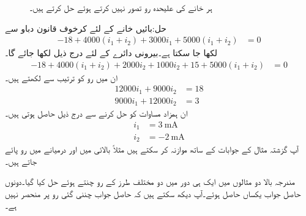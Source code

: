 \begin{figure}
\centering
{}%
\caption{ہر خانے کی علیحدہ رو تصور نہیں کرتے ہوئے حل کرتے ہیں۔}
\label{شکل_جوڑ_رو_دوسری_کو_لپیٹتی_ہے}
\end{figure}%
حل:بائیں خانے کے لئے کرخوف قانون دباو سے
\begin{align*}
-18+4000(i_1+i_2)+3000 i_1+5000(i_1+i_2)&=0
\end{align*}
لکھا جا سکتا ہے۔بیرونی دائرے کے لئے درج ذیل لکھا جائے گا۔
\begin{align*}
-18+4000(i_1+i_2)+2000i_2 +1000i_2 +15+5000(i_1+i_2)&=0
\end{align*}
ان میں رو کو ترتیب سے لکھتے ہیں۔
\begin{align*}
12000 i_1+9000 i_2&=18\\
9000i_1+12000i_2&=3
\end{align*}
ان ہمزاد مساوات کو حل کرنے سے درج ذیل حاصل ہوتی ہیں۔
\begin{align*}
i_1&=\SI{3}{\milli\ampere}\\
i_2&=\SI{-2}{\milli\ampere}
\end{align*}
آپ گزشتہ مثال کے جوابات کے ساتھ موازنہ کر سکتے ہیں مثلاً بالائی  میں  اور درمیانے  میں  رو پائے جاتے ہیں۔

مندرجہ بالا دو مثالوں میں ایک ہی دور میں دو مختلف طرز کے رو چنتے ہوئے حل کیا گیا۔دونوں حاصل جواب یکساں حاصل ہوئے۔آپ دیکھ سکتے ہیں کہ حاصل جواب چننی گئی رو پر منحصر نہیں ہے۔

